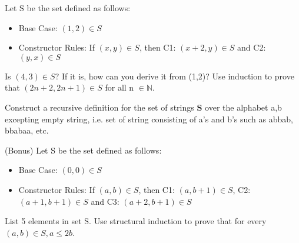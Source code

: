 \documentclass[solution, letterpaper]{cs20inclass}
\begin{document}
\problem Let S be the set defined as follows:
\begin{itemize}
\item Base Case: $(1,2) \in S$
\item Constructor Rules: If $(x,y)\in S$, then C1: $(x+2, y) \in S$ and C2: $(y,x) \in S$ 
\end{itemize}
\subproblem Is $(4,3)\in S$? If it is, how can you derive it from (1,2)?
\subproblem Use induction to prove that $(2n+2, 2n+1)\in S$ for all n $\in \mathbb{N}$.
\pagebreak

\problem Construct a recursive definition for the set of strings \textbf{S} over the alphabet a,b excepting empty string, i.e. set of string consisting of a's and b's such as abbab, bbabaa, etc.

\problem(Bonus) Let S be the set defined as follows:
\begin{itemize}
\item Base Case: $(0,0) \in S$
\item Constructor Rules: If $(a,b)\in S$, then C1: $(a, b+1) \in S$, C2: $(a+1,b+1)\in S$ and C3: $(a+2, b+1)\in S$ 
\end{itemize}
\subproblem List 5 elements in set S.
\subproblem Use structural induction to prove that for every $(a,b)\in S, a\leq 2b$.
\end{document}
